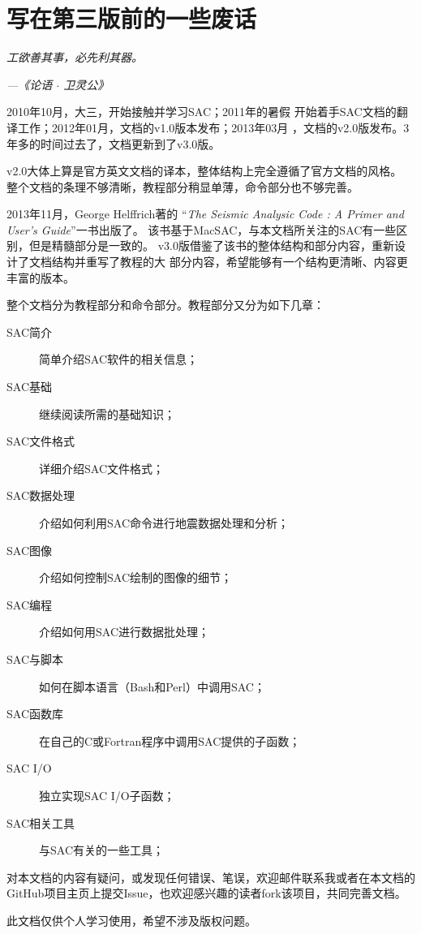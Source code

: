 \section*{\centering 写在第三版前的一些废话}

\begin{shadequote*}
\Large\emph{
工欲善其事，必先利其器。
}
\par\hfill\emph{\normalsize---《论语 $\cdot$ 卫灵公》}
\end{shadequote*}

2010年10月，大三，开始接触并学习SAC；2011年的暑假
开始着手SAC文档的翻译工作；2012年01月，文档的v1.0版本发布；2013年03月
，文档的v2.0版发布。3年多的时间过去了，文档更新到了v3.0版。

v2.0大体上算是官方英文文档的译本，整体结构上完全遵循了官方文档的风格。
整个文档的条理不够清晰，教程部分稍显单薄，命令部分也不够完善。

2013年11月，George Helffrich著的
``\emph{The Seismic Analysic Code : A Primer and User's Guide}''一书出版了。
该书基于MacSAC，与本文档所关注的SAC有一些区别，但是精髓部分是一致的。
v3.0版借鉴了该书的整体结构和部分内容，重新设计了文档结构并重写了教程的大
部分内容，希望能够有一个结构更清晰、内容更丰富的版本。

整个文档分为教程部分和命令部分。教程部分又分为如下几章：
\begin{description}
\item[SAC简介] 简单介绍SAC软件的相关信息；
\item[SAC基础] 继续阅读所需的基础知识；
\item[SAC文件格式] 详细介绍SAC文件格式；
\item[SAC数据处理] 介绍如何利用SAC命令进行地震数据处理和分析；
\item[SAC图像] 介绍如何控制SAC绘制的图像的细节；
\item[SAC编程] 介绍如何用SAC进行数据批处理；
\item[SAC与脚本] 如何在脚本语言（Bash和Perl）中调用SAC；
\item[SAC函数库] 在自己的C或Fortran程序中调用SAC提供的子函数；
\item[SAC I/O] 独立实现SAC I/O子函数；
\item[SAC相关工具] 与SAC有关的一些工具；
\end{description}

对本文档的内容有疑问，或发现任何错误、笔误，欢迎邮件联系我或者在本文档的
GitHub项目主页上提交Issue，也欢迎感兴趣的读者fork该项目，共同完善文档。

此文档仅供个人学习使用，希望不涉及版权问题。

